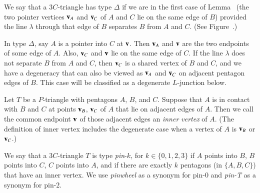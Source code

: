 \begin{definition}[$\Delta$]
  We say that a $3C$-triangle has type $\Delta$ if we are in the first
  case of Lemma~ (the two pointer vertices ${\mathbf v}_A$ and
  ${\mathbf v}_C$ of $A$ and $C$ lie on the same edge of $B$) provided the line $\lambda$
  through that edge of $B$ separates $B$ from $A$ and $C$. (See
  Figure~.)
\end{definition}



In type $\Delta$, say $A$ is a pointer into $C$ at ${\mathbf v}$.  Then ${\mathbf v}_A$
and ${\mathbf v}$ are the two endpoints of some edge of $A$.  Also, ${\mathbf v}_C$ and
${\mathbf v}$ lie on the same edge of $C$.  If the line $\lambda$ does not
separate $B$ from $A$ and $C$, then ${\mathbf v}_C$ is a shared vertex of $B$
and $C$, and we have a degeneracy that can also be viewed as ${\mathbf v}_A$
and ${\mathbf v}_C$ on adjacent pentagon edges of $B$.  This case will be
classified as a degenerate $L$-junction below.

\begin{definition} Let $T$ be a $P$-triangle with pentagons $A$, $B$,
  and $C$.  Suppose that $A$ is in contact with $B$ and $C$ at points
  ${\mathbf v}_B$, ${\mathbf v}_C$ of $A$ that lie on adjacent edges of $A$.  Then we
  call the common endpoint ${\mathbf v}$ of those adjacent edges an {\it inner
    vertex} of $A$.  (The definition of inner vertex includes the
  degenerate case when a vertex of $A$ is ${\mathbf v}_B$ or ${\mathbf v}_C$.)
\end{definition}

\begin{definition} We say that a $3C$-triangle $T$ is type {\it
    pin}-$k$, for $k\in \{0,1,2,3\}$ if $A$ points into $B$, $B$
  points into $C$, $C$ points into $A$, and if there are exactly $k$
  pentagons (in $\{A,B,C\}$) that have an inner vertex.  We use {\it
    pinwheel} as a synonym for pin-$0$ and {\it pin-T} as a synonym
  for pin-$2$.
\end{definition}

